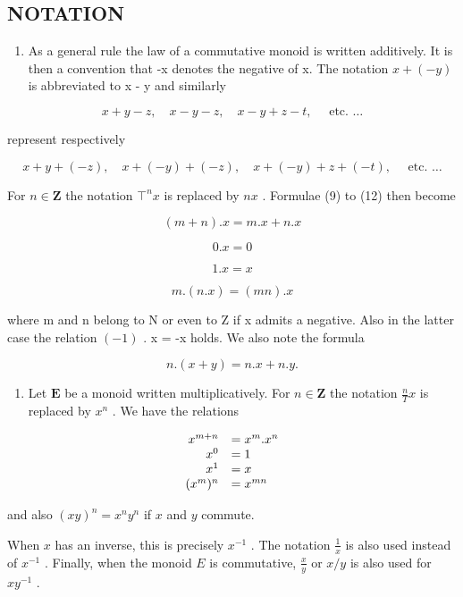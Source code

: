 \subsection{NOTATION}

\begin{enumerate}
\def\labelenumi{(\alph{enumi})}
\tightlist
\item
  As a general rule the law of a commutative monoid is written additively. It is then a convention that -x denotes the negative of x. The notation \(x + (-y)\) is abbreviated to x - y and similarly
\end{enumerate}

\[
x + y - z, \quad x - y - z, \quad x - y + z - t, \quad \text { etc. } \dots
\]

represent respectively

\[
x + y + (- z), \quad x + (- y) + (- z), \quad x + (- y) + z + (- t), \quad \text { etc. } \dots
\]

For \(n \in \mathbf{Z}\) the notation \(\top^n x\) is replaced by \(nx\) . Formulae (9) to (12) then become

\[
(m + n). x = m. x + n. x\tag{13}
\]

\[
0. x = 0\tag{14}
\]

\[
1. x = x\tag{15}
\]

\[
m. (n. x) = (m n). x\tag{16}
\]

where m and n belong to N or even to Z if x admits a negative. Also in the latter case the relation \((-1)\) . x = -x holds. We also note the formula

\[
n. (x + y) = n. x + n. y.\tag{17}
\]

\begin{enumerate}
\def\labelenumi{(\alph{enumi})}
\setcounter{enumi}{1}
\tightlist
\item
  Let \(\mathbf{E}\) be a monoid written multiplicatively. For \(n \in \mathbf{Z}\) the notation \(\frac{n}{T} x\) is replaced by \(x^n\) . We have the relations
\end{enumerate}

\[
\begin{array}{r l} x ^ {m + n} & = x ^ {m}. x ^ {n} \\ x ^ {0} & = 1 \\ x ^ {1} & = x \\ (x ^ {m}) ^ {n} & = x ^ {m n} \end{array}
\]

and also \((xy)^n = x^n y^n\) if \(x\) and \(y\) commute.

When \(x\) has an inverse, this is precisely \(x^{-1}\) . The notation \(\frac{1}{x}\) is also used instead of \(x^{-1}\) . Finally, when the monoid \(E\) is commutative, \(\frac{x}{y}\) or \(x / y\) is also used for \(xy^{-1}\) .

